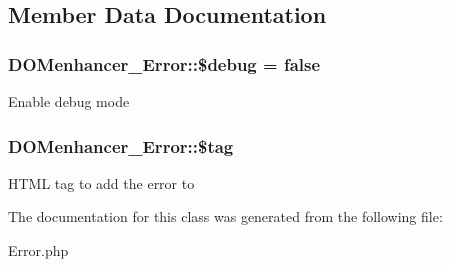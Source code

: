 \subsection{Member Data Documentation}
\hypertarget{classDOMenhancer__Error_a328b2646a3dbbe1316afb1f5875fd88b}{
\subsubsection[{\$debug}]{\setlength{\rightskip}{0pt plus 5cm}D\-O\-Menhancer\-\_\-\-Error\-::\$debug = false\hspace{0.3cm}{\ttfamily [static]}}}\label{classDOMenhancer__Error_a328b2646a3dbbe1316afb1f5875fd88b}
Enable debug mode \hypertarget{classDOMenhancer__Error_acc8efe5f78c69463019e9e66919e906e}{
\subsubsection[{\$tag}]{\setlength{\rightskip}{0pt plus 5cm}D\-O\-Menhancer\-\_\-\-Error\-::\$tag\hspace{0.3cm}{\ttfamily [static]}}}\label{classDOMenhancer__Error_acc8efe5f78c69463019e9e66919e906e}
H\-T\-M\-L tag to add the error to 

The documentation for this class was generated from the following file\-:\begin{DoxyCompactItemize}
\item 
Error.\-php\end{DoxyCompactItemize}
